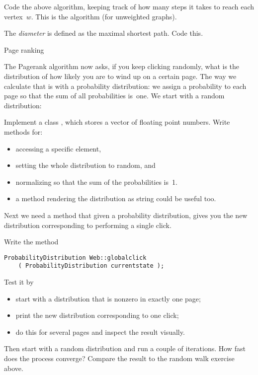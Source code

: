 \begin{exercise}
  \label{ex:SSSD}
  Code the above algorithm, keeping track of how many steps it takes
  to reach each vertex~$w$. This is the  algorithm (for unweighted graphs).

  The \emph{diameter} is defined as the maximal
  shortest path. Code this.
\end{exercise}

 {Page ranking}

The Pagerank algorithm now asks, if you keep clicking randomly, what
is the distribution of how likely you are to wind up on a certain
page. The way we calculate that is with a probability distribution: we
assign a probability to each page so that the sum of all probabilities
is~one. We start with a random distribution:
%

\begin{exercise}
  Implement a class , which stores a vector
  of floating point numbers. Write methods for:
  \begin{itemize}
  \item
    accessing a specific
    element,
  \item setting the whole distribution to random, and
  \item normalizing
    so that the sum of the probabilities is~1.
  \item a method rendering the distribution as string could be useful too.
  \end{itemize}
\end{exercise}

Next we need a method that given a probability distribution,
gives you the new distribution corresponding to performing a single click.

\begin{exercise}
  Write the method
\begin{verbatim}
ProbabilityDistribution Web::globalclick
    ( ProbabilityDistribution currentstate );
\end{verbatim}
Test it by
\begin{itemize}
\item start with a distribution that is nonzero in exactly one page;
\item print the new distribution corresponding to one click;
\item do this for several pages and inspect the result visually.
\end{itemize}
Then start with a random distribution and run a couple of
iterations. How fast does the process converge? Compare the result to
the random walk exercise above.
\end{exercise}

